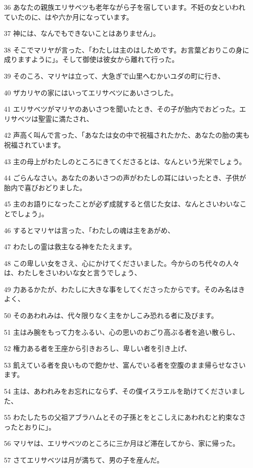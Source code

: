 \par 36 あなたの親族エリサベツも老年ながら子を宿しています。不妊の女といわれていたのに、はや六か月になっています。
\par 37 神には、なんでもできないことはありません」。
\par 38 そこでマリヤが言った、「わたしは主のはしためです。お言葉どおりこの身に成りますように」。そして御使は彼女から離れて行った。
\par 39 そのころ、マリヤは立って、大急ぎで山里へむかいユダの町に行き、
\par 40 ザカリヤの家にはいってエリサベツにあいさつした。
\par 41 エリサベツがマリヤのあいさつを聞いたとき、その子が胎内でおどった。エリサベツは聖霊に満たされ、
\par 42 声高く叫んで言った、「あなたは女の中で祝福されたかた、あなたの胎の実も祝福されています。
\par 43 主の母上がわたしのところにきてくださるとは、なんという光栄でしょう。
\par 44 ごらんなさい。あなたのあいさつの声がわたしの耳にはいったとき、子供が胎内で喜びおどりました。
\par 45 主のお語りになったことが必ず成就すると信じた女は、なんとさいわいなことでしょう」。
\par 46 するとマリヤは言った、「わたしの魂は主をあがめ、
\par 47 わたしの霊は救主なる神をたたえます。
\par 48 この卑しい女をさえ、心にかけてくださいました。今からのち代々の人々は、わたしをさいわいな女と言うでしょう、
\par 49 力あるかたが、わたしに大きな事をしてくださったからです。そのみ名はきよく、
\par 50 そのあわれみは、代々限りなく主をかしこみ恐れる者に及びます。
\par 51 主はみ腕をもって力をふるい、心の思いのおごり高ぶる者を追い散らし、
\par 52 権力ある者を王座から引きおろし、卑しい者を引き上げ、
\par 53 飢えている者を良いもので飽かせ、富んでいる者を空腹のまま帰らせなさいます。
\par 54 主は、あわれみをお忘れにならず、その僕イスラエルを助けてくださいました、
\par 55 わたしたちの父祖アブラハムとその子孫とをとこしえにあわれむと約束なさったとおりに」。
\par 56 マリヤは、エリサベツのところに三か月ほど滞在してから、家に帰った。
\par 57 さてエリサベツは月が満ちて、男の子を産んだ。
